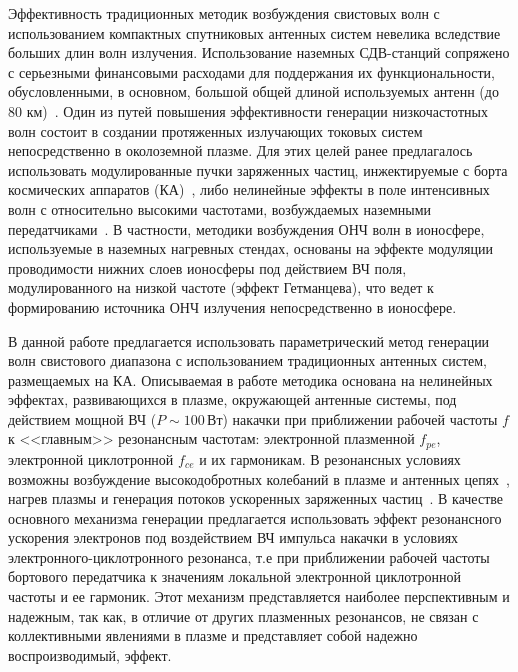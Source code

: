 \documentclass[autoref,10pt]{disser}
\begin{document}
Эффективность традиционных методик возбуждения свистовых волн с использованием компактных спутниковых антенных систем невелика вследствие больших длин волн излучения.  Использование наземных СДВ-станций сопряжено с  серьезными финансовыми расходами для поддержания их функциональности, обусловленными, в основном,  большой общей длиной используемых антенн (до 80 км)~\cite{SPBEACON}. Один из путей повышения эффективности генерации низкочастотных волн состоит в создании протяженных излучающих токовых систем непосредственно  в околоземной плазме. Для этих целей ранее предлагалось использовать модулированные пучки заряженных частиц, инжектируемые с борта космических аппаратов (КА)~\cite{Starodubtsev, Holzworth}, либо нелинейные эффекты в поле интенсивных волн с относительно высокими частотами, возбуждаемых наземными передатчиками~\cite{HAARP, SPS}. В частности, методики возбуждения ОНЧ волн в ионосфере, используемые в наземных нагревных стендах, основаны на эффекте модуляции проводимости нижних слоев ионосферы под действием ВЧ поля, модулированного на низкой частоте (эффект Гетманцева), что ведет к формированию источника ОНЧ излучения непосредственно в ионосфере.

В данной работе  предлагается использовать параметрический метод генерации волн свистового диапазона с использованием традиционных антенных систем, размещаемых на КА. Описываемая в работе методика основана  на  нелинейных эффектах, развивающихся в плазме, окружающей антенные системы, под действием мощной ВЧ ($P\sim100$\,Вт) накачки  при приближении рабочей частоты $f$ к <<главным>> резонансным частотам: электронной плазменной $f_{pe}$, электронной циклотронной $f_{ce}$ и их гармоникам. В резонансных условиях возможны возбуждение высокодобротных колебаний в плазме и антенных цепях~\cite{WHISPER}, нагрев плазмы и генерация потоков ускоренных заряженных частиц~\cite{Pulinets,Galperin,Huang,James}.
В качестве основного механизма генерации предлагается использовать эффект резонансного ускорения электронов под воздействием ВЧ импульса накачки в условиях электронного-циклотронного резонанса, т.е при приближении рабочей частоты бортового передатчика к значениям локальной электронной циклотронной частоты и ее гармоник.  Этот механизм представляется наиболее перспективным и надежным, так как, в отличие от других плазменных резонансов, не связан с  коллективными явлениями в плазме и представляет собой надежно воспроизводимый, эффект. 
\end{document}
